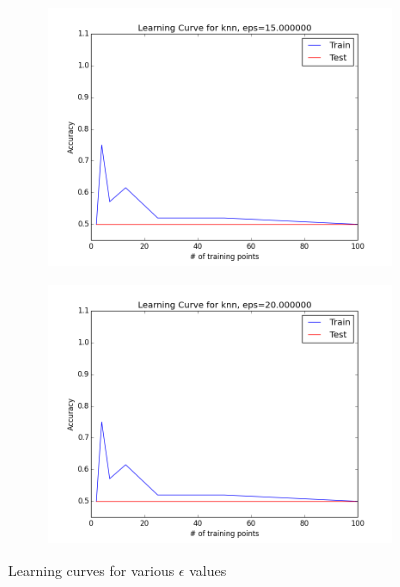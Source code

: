 \documentclass{article}
\begin{document}
\begin{figure} [h!]
\begin{subfigure} [h!]{.4\textwidth}
		\includegraphics[scale = .45]{LC_eps15_000000.png}
		\end{subfigure}
		\hfill
		\begin{subfigure} [h!]{.4\textwidth}
		\includegraphics[scale = .45]{LC_eps20_000000.png}
		\end{subfigure}
		\caption{Learning curves for various $\epsilon$ values}
		\label{eps_figs}
	\end{figure}
	
	\clearpage
	
\end{document}
